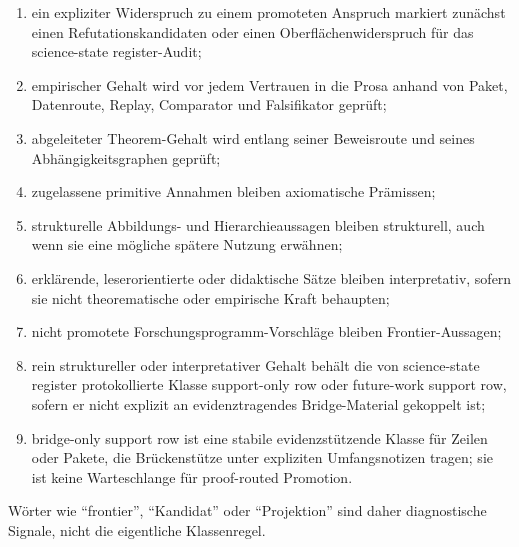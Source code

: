 \begin{enumerate}
\item ein expliziter Widerspruch zu einem promoteten Anspruch markiert
      zunächst einen Refutationskandidaten oder einen Oberflächenwiderspruch
      für das science-state register-Audit;
\item empirischer Gehalt wird vor jedem Vertrauen in die Prosa anhand von
      Paket, Datenroute, Replay, Comparator und Falsifikator geprüft;
\item abgeleiteter Theorem-Gehalt wird entlang seiner Beweisroute und seines
      Abhängigkeitsgraphen geprüft;
\item zugelassene primitive Annahmen bleiben axiomatische Prämissen;
\item strukturelle Abbildungs- und Hierarchieaussagen bleiben strukturell,
      auch wenn sie eine mögliche spätere Nutzung erwähnen;
\item erklärende, leserorientierte oder didaktische Sätze bleiben interpretativ,
      sofern sie nicht theorematische oder empirische Kraft behaupten;
\item nicht promotete Forschungsprogramm-Vorschläge bleiben Frontier-Aussagen;
\item rein struktureller oder interpretativer Gehalt behält die von science-state register
      protokollierte Klasse support-only row oder future-work support row,
      sofern er nicht explizit an evidenztragendes Bridge-Material gekoppelt ist;
\item bridge-only support row ist eine stabile evidenzstützende Klasse für Zeilen
      oder Pakete, die Brückenstütze unter expliziten Umfangsnotizen tragen;
      sie ist keine Warteschlange für proof-routed Promotion.
\end{enumerate}
Wörter wie ``frontier'', ``Kandidat'' oder ``Projektion'' sind daher
diagnostische Signale, nicht die eigentliche Klassenregel.

